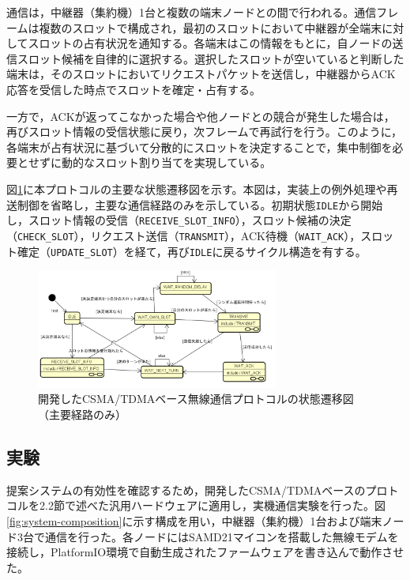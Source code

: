 \documentclass[technicalreport]{ieicej}
\begin{document}
通信は，中継器（集約機）1台と複数の端末ノードとの間で行われる。通信フレームは複数のスロットで構成され，最初のスロットにおいて中継器が全端末に対してスロットの占有状況を通知する。各端末はこの情報をもとに，自ノードの送信スロット候補を自律的に選択する。選択したスロットが空いていると判断した端末は，そのスロットにおいてリクエストパケットを送信し，中継器からACK応答を受信した時点でスロットを確定・占有する。

一方で，ACKが返ってこなかった場合や他ノードとの競合が発生した場合は，再びスロット情報の受信状態に戻り，次フレームで再試行を行う。このように，各端末が占有状況に基づいて分散的にスロットを決定することで，集中制御を必要とせずに動的なスロット割り当てを実現している。

図\ref{fig:protocol-state-machine}に本プロトコルの主要な状態遷移図を示す。本図は，実装上の例外処理や再送制御を省略し，主要な通信経路のみを示している。初期状態\texttt{IDLE}から開始し，スロット情報の受信（\texttt{RECEIVE\_SLOT\_INFO}），スロット候補の決定（\texttt{CHECK\_SLOT}），リクエスト送信（\texttt{TRANSMIT}），ACK待機（\texttt{WAIT\_ACK}），スロット確定（\texttt{UPDATE\_SLOT}）を経て，再び\texttt{IDLE}に戻るサイクル構造を有する。

\begin{figure}[tb]
  \centering
  \includegraphics[width=80mm]{./images/protocol-state-machine3.png}
  \caption{開発したCSMA/TDMAベース無線通信プロトコルの状態遷移図（主要経路のみ）}
  \label{fig:protocol-state-machine}
\end{figure}


\subsection{実験}
提案システムの有効性を確認するため，開発したCSMA/TDMAベースのプロトコルを2.2節で述べた汎用ハードウェアに適用し，実機通信実験を行った。図\ref{fig:system-composition}に示す構成を用い，中継器（集約機）1台および端末ノード3台で通信を行った。各ノードにはSAMD21マイコンを搭載した無線モデムを接続し，PlatformIO環境で自動生成されたファームウェアを書き込んで動作させた。
\end{document}
